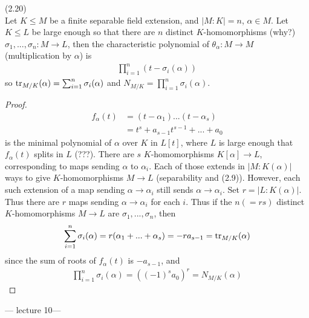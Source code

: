 \documentclass[a4paper]{article}
\begin{document}
\begin{thm} (2.20)\\
Let $K \leq M$ be a finite separable field extension, and $|M:K| =n$, $\alpha \in M$. Let $K \leq L$ be large enough so that there are $n$ distinct $K$-homomorphisms (why?) $\sigma_1,...,\sigma_n: M \to L$, then the characteristic polynomial of $\theta_\alpha :M \to M$ (multiplication by $\alpha$) is
\begin{equation*}
\begin{aligned}
\prod_{i=1}^n (t-\sigma_i(\alpha))
\end{aligned}
\end{equation*}
so $\operatorname{tr}_{M/K} (\alpha) = \sum_{i=1}^n \sigma_i (\alpha)$ and $N_{M/K} = \prod_{i=1}^n \sigma_i(\alpha)$.
\begin{proof}
\begin{equation*}
\begin{aligned}
f_\alpha(t) &= (t-\alpha_1)...(t-\alpha_s)\\
&= t^s + a_{s-1}t^{s-1}+...+a_0
\end{aligned}
\end{equation*}
is the minimal polynomial of $\alpha$ over $K$ in $L[t]$, where $L$ is large enough that $f_\alpha(t)$ splits in $L$ (???). There are $s$ $K$-homomorphisms $K[\alpha] \to L$, corresponding to maps sending $\alpha$ to $\alpha_i$. Each of those extends in $|M:K(\alpha)|$ ways to give $K$-homomorphisms $M \to L$ (separability and (2.9)). However, each such extension of a map sending $\alpha \to \alpha_i$ still sends $\alpha \to \alpha_i$. Set $r = |L:K(\alpha)|$. Thus there are $r$ maps sending $\alpha \to \alpha_i$ for each $i$. Thus if the $n(=rs)$ distinct $K$-homomorphisms $M \to L$ are $\sigma_1,...,\sigma_n$, then
\begin{equation*}
\begin{aligned}
\sum_{i=1}^n \sigma_i(\alpha) = r(\alpha_1+...+\alpha_s) =-ra_{s-1} = \operatorname{tr}_{M/K}(\alpha)
\end{aligned}
\end{equation*}
since the sum of roots of $f_\alpha(t)$ is $-a_{s-1}$, and
\begin{equation*}
\begin{aligned}
\prod_{i=1}^n \sigma_i(\alpha) = ((-1)^s a_0)^r = N_{M/K}(\alpha)
\end{aligned}
\end{equation*}
\end{proof}
\end{thm}

--- lecture 10---
\end{document}
